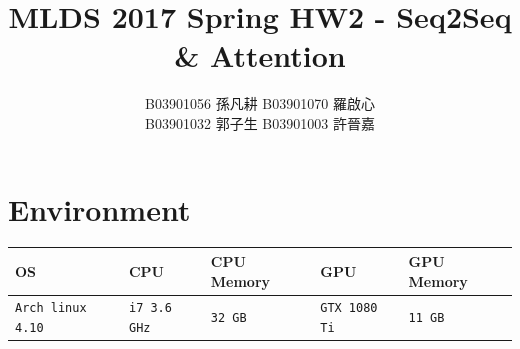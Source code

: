 \documentclass[12pt, a4paper]{article}
\title{MLDS 2017 Spring HW2 - Seq2Seq \& Attention}
\author{B03901056 孫凡耕 B03901070 羅啟心\\
        B03901032 郭子生 B03901003 許晉嘉}
\date{\vspace{-5ex}}
\theoremstyle{mystyle}	%
\begin{document}
\maketitle 
{}%
\thispagestyle{empty}
\section{Environment}
  \begin{table}[h]
  \centering
    \begin{tabular}{|C{4cm}|C{2.5cm}|C{3cm}|C{2.5cm}|C{3cm}|}
      \hline
      OS & CPU & CPU Memory & GPU & GPU Memory \\
      \hline
      \texttt{Arch linux 4.10} &
      \texttt{i7 3.6 GHz} &
      \texttt{32 GB} &
      \texttt{GTX 1080 Ti}  &
      \texttt{11 GB}  \\
      \hline
    \end{tabular}
  \end{table}
\end{document}
